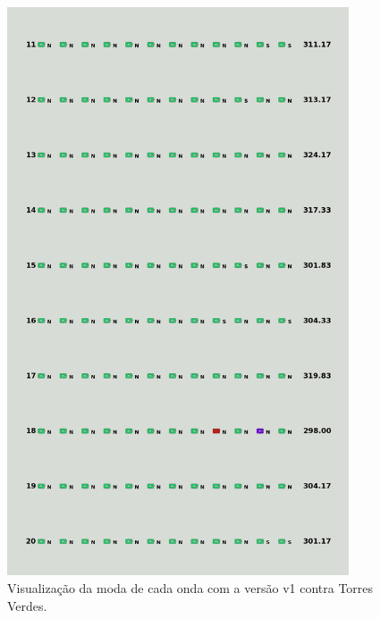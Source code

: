 \begin{figure}[H]
  \centering
  \includegraphics[width=0.9\textwidth]{figuras/td/td_allgreen_ai_mode_1_2.png}
  \caption{Visualização da moda de cada onda com a versão v1 contra Torres Verdes.}
  \label{fig:td-moda-green-1-2}
\end{figure}

